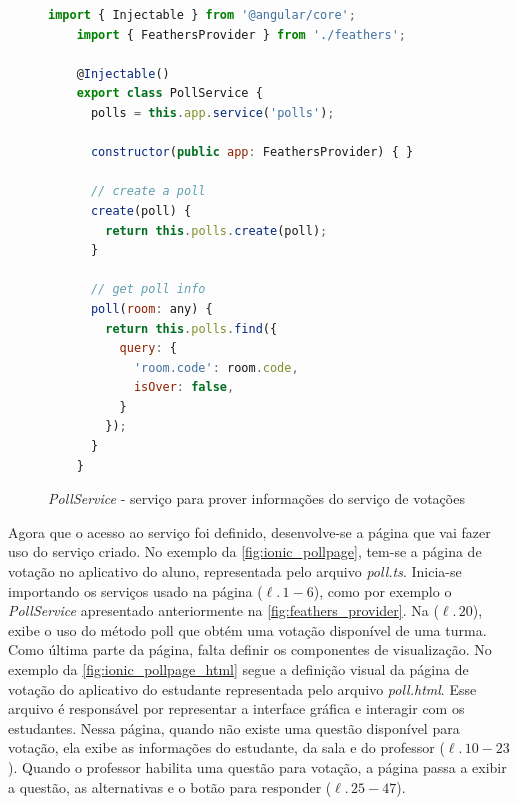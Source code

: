 \begin{figure}[!ht]
  \caption{\textit{PollService} - serviço para prover informações do serviço de votações}
  \label{fig:feathers_provider}
  \begin{lstlisting}[language=JavaScript]
    import { Injectable } from '@angular/core';
    import { FeathersProvider } from './feathers';

    @Injectable()
    export class PollService {
      polls = this.app.service('polls');

      constructor(public app: FeathersProvider) { }

      // create a poll
      create(poll) {
        return this.polls.create(poll);
      }

      // get poll info
      poll(room: any) {
        return this.polls.find({
          query: {
            'room.code': room.code,
            isOver: false,
          }
        });
      }
    }
  \end{lstlisting}
  \doautor
\end{figure}

Agora que o acesso ao serviço foi definido, desenvolve-se a página que vai
fazer uso do serviço criado. No exemplo da \autoref{fig:ionic_pollpage}, tem-se
a página de votação no aplicativo do aluno, representada pelo arquivo \textit{poll.ts}.
Inicia-se importando os serviços usado na página ($\ell.\,1-6$), como por exemplo o \textit{PollService}
apresentado anteriormente na \autoref{fig:feathers_provider}. Na ($\ell.\,20$), exibe
o uso do método poll que obtém uma votação disponível de uma turma. Como última parte
da página, falta definir os componentes de visualização. No exemplo da \autoref{fig:ionic_pollpage_html}
segue a definição visual da página de votação do aplicativo do estudante representada pelo
arquivo \textit{poll.html}. Esse arquivo é responsável por representar a interface gráfica e interagir
com os estudantes. Nessa página, quando não existe uma questão disponível para votação, ela
exibe as informações do estudante, da sala e do professor ($\ell.\,10-23$). Quando o professor habilita uma questão
para votação, a página passa a exibir a questão, as alternativas e o botão para responder ($\ell.\,25-47$).

